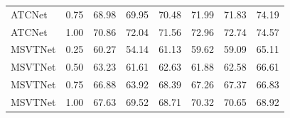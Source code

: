 \begin{table}[!t]
{\begin{tabular}{l c r r r r r r}
ATCNet & 0.75 & 68.98 & 69.95 & 70.48 & 71.99 & 71.83 & 74.19\\
ATCNet & 1.00 & 70.86 & 72.04 & 71.56 & 72.96 & 72.74 & 74.57\\
\addlinespace
MSVTNet & 0.25 & 60.27 & 54.14 & 61.13 & 59.62 & 59.09 & 65.11\\
MSVTNet & 0.50 & 63.23 & 61.61 & 62.63 & 61.88 & 62.58 & 66.61\\
MSVTNet & 0.75 & 66.88 & 63.92 & 68.39 & 67.26 & 67.37 & 66.83\\
MSVTNet & 1.00 & 67.63 & 69.52 & 68.71 & 70.32 & 70.65 & 68.92\\
\bottomrule
\end{tabular}%
}
\end{table}



